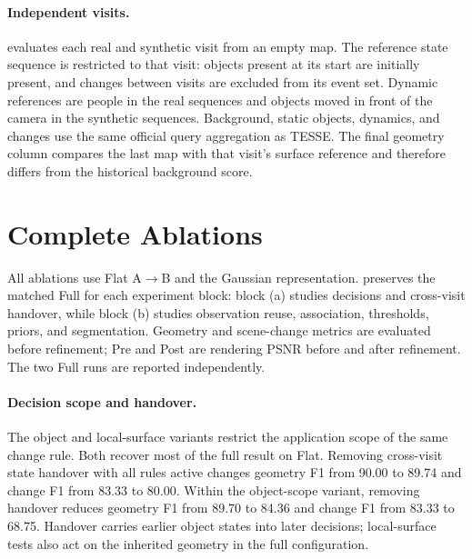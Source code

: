 \paragraph{Independent visits.}
 evaluates each real and synthetic visit from an empty map. The reference state sequence
is restricted to that visit: objects present at its start are initially present, and changes between visits are
excluded from its event set. Dynamic references are people in the real sequences and objects moved in front
of the camera in the synthetic sequences. Background, static objects, dynamics, and changes use the same
official query aggregation as TESSE. The final geometry column compares the last map with that visit's surface
reference and therefore differs from the historical background score.

\section{Complete Ablations}



All ablations use Flat A$\rightarrow$B and the Gaussian representation.  preserves the
matched Full for each experiment block: block (a) studies decisions and cross-visit handover, while block (b)
studies observation reuse, association, thresholds, priors, and segmentation. Geometry and scene-change
metrics are evaluated before refinement; Pre and Post are rendering PSNR before and after refinement.
The two Full runs are reported independently.

\paragraph{Decision scope and handover.}
The object and local-surface variants restrict the application scope of the same change rule.
Both recover most of the full result on Flat. Removing cross-visit state handover with all rules active changes
geometry F1 from 90.00 to 89.74 and change F1 from 83.33 to 80.00.
Within the object-scope variant, removing handover reduces geometry F1 from 89.70 to 84.36 and change F1 from
83.33 to 68.75. Handover carries earlier object states into later decisions; local-surface tests also act on
the inherited geometry in the full configuration.

